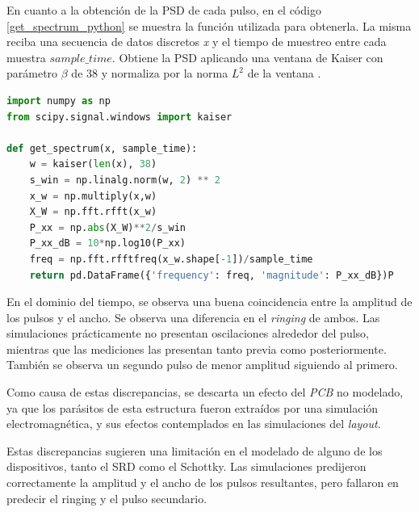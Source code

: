 En cuanto a la obtención de la PSD de cada pulso, en el código
\ref{get_spectrum_python} se muestra la función utilizada para obtenerla. La
misma reciba una secuencia de datos discretos \textit{x} y el tiempo de muestreo
entre cada muestra $sample\_time$. Obtiene la PSD aplicando una ventana de
Kaiser con parámetro $\beta$ de 38 y normaliza por la norma $L^2$ de la
ventana \cite{oppenheim1999dsp}.

\begin{lstlisting}[language=Python, style=PythonStyle, caption=Función para obtener PSD,
label=get_spectrum_python, float]
import numpy as np
from scipy.signal.windows import kaiser

def get_spectrum(x, sample_time):
    w = kaiser(len(x), 38)
    s_win = np.linalg.norm(w, 2) ** 2
    x_w = np.multiply(x,w)
    X_W = np.fft.rfft(x_w)
    P_xx = np.abs(X_W)**2/s_win
    P_xx_dB = 10*np.log10(P_xx)
    freq = np.fft.rfftfreq(x_w.shape[-1])/sample_time
    return pd.DataFrame({'frequency': freq, 'magnitude': P_xx_dB})P
\end{lstlisting}

En el dominio del tiempo, se observa una buena coincidencia entre la amplitud de
los pulsos y el ancho. Se observa una diferencia en el \textit{ringing} de
ambos.  Las simulaciones prácticamente no presentan oscilaciones alrededor del
pulso, mientras que las mediciones las presentan tanto previa como
posteriormente.  También se observa un segundo pulso de menor amplitud siguiendo
al primero.

Como causa de estas discrepancias, se descarta un efecto del \textit{PCB} no
modelado, ya que los parásitos de esta estructura fueron extraídos por una
simulación electromagnética, y sus efectos contemplados en las simulaciones del
\textit{layout}.

Estas  discrepancias sugieren una limitación en el modelado de alguno de los 
dispositivos, tanto el SRD como el Schottky. Las simulaciones predijeron correctamente
la amplitud y el ancho de los pulsos resultantes, pero fallaron en predecir 
el ringing y el pulso secundario.

